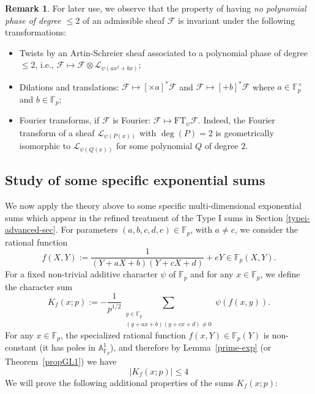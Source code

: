 \documentclass[12pt,a4paper,reqno]{amsart}
\numberwithin{equation}{section}
\newcommand{\FT}{\mathrm{FT}}
\theoremstyle{plain}
\theoremstyle{definition}
\newtheorem{remark}[theorem]{Remark}
\newcommand\F{\mathbb{F}}
\newcommand\mcF{\mathcal{F}}
\newcommand\mcL{\mathcal{L}}
\newcommand\Af{\mathbb{A}^1}
\newcommand\Fp{\F_{p}}
\begin{document}
\begin{remark}\label{invarianceremark}
  For later use, we observe that the property of having \emph{no
    polynomial phase of degree $\leq 2$} of an admissible sheaf $\mcF$
  is invariant under the following transformations:
\begin{itemize}
\item Twists by an Artin-Schreier sheaf associated to a polynomial
  phase of degree $\leq 2$, i.e., $\mcF\mapsto
  \mcF\otimes\mcL_{\psi(ax^2+bx)}$;
\item Dilations and translations: $\mcF\mapsto [\times a]^*\mcF$ and $\mcF \mapsto [+b]^* \mcF$ where
  $a \in \Fp^\times$ and $b \in \Fp$;
\item Fourier transforms, if $\mcF$ is Fourier: $\mcF\mapsto
  \FT_\psi\mcF$. Indeed, the Fourier transform of a sheaf
  $\mcL_{\psi(P(x))}$ with $\deg(P)=2$ is geometrically isomorphic to
  $\mcL_{\psi(Q(x))}$ for some polynomial $Q$ of degree $2$.
\end{itemize}
\end{remark}

\subsection{Study of some specific exponential sums}\label{study-sec}

We now apply the theory above to some specific multi-dimensional
exponential sums which appear in the refined treatment of the Type I
sums in Section \ref{typei-advanced-sec}. For parameters
$(a,b,c,d,e)\in \Fp$, with $a\neq c$, we consider the rational
function
$$
f(X,Y):=\frac{1}{(Y+aX+b)(Y+cX+d)}+eY\in \Fp(X,Y).
$$
For a fixed non-trivial additive character $\psi$ of $\Fp$ and for any
$x\in \Fp$, we define the character sum
\begin{equation}\label{Kfdef}
  K_f(x;p):=-\frac{1}{p^{1/2}}
  \sum_{\substack{y\in \Fp\\(y+ax+b)(y+cx+d)\neq 0}}\psi(f(x,y)).
\end{equation}
For any $x\in \Fp$, the specialized rational function
$f(x,Y)\in\Fp(Y)$ is non-constant (it has poles in $\Af_{\F_p}$), and
therefore by Lemma~\ref{prime-exp} (or Theorem~\ref{propGL1}) we have
\begin{equation}\label{klo}
|K_f(x;p)|\leq 4
\end{equation}
We will prove  the following additional properties of the sums
$K_f(x;p)$:
\end{document}
